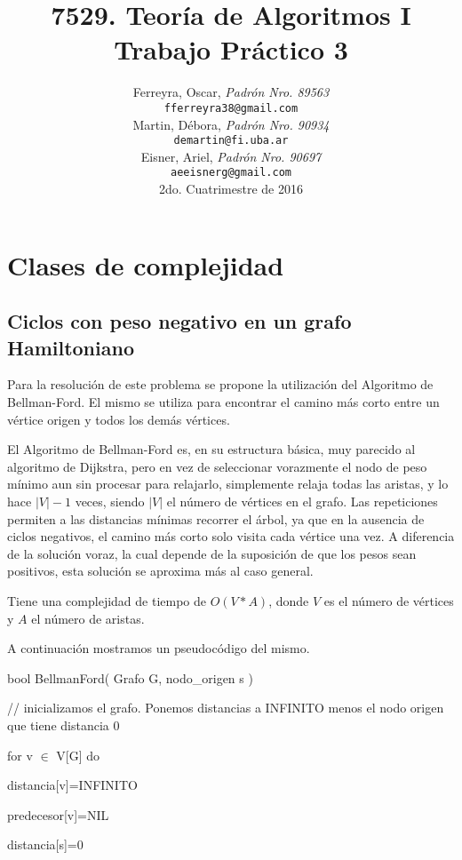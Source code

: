 \documentclass[a4paper,10pt]{article}
\title{
\textbf{ 
	7529. Teoría de Algoritmos I\\
	Trabajo Práctico 3
	}
}
\author{ Ferreyra, Oscar, \textit{Padrón Nro. 89563} \\
\texttt{ fferreyra38@gmail.com } \\[2.5ex]
Martin, Débora, \textit{Padrón Nro. 90934} \\
\texttt{ demartin@fi.uba.ar } \\[2.5ex]
Eisner, Ariel, \textit{Padrón Nro. 90697} \\
\texttt{ aeeisnerg@gmail.com } \\[2.5ex]
\normalsize{2do. Cuatrimestre de 2016} \\
}
\date{}
\begin{document}
\maketitle

\thispagestyle{empty} %
\setcounter{page}{0}
\newpage
\tableofcontents

\newpage

\section{Clases de complejidad}


\subsection{Ciclos con peso negativo en un grafo Hamiltoniano}
Para la resolución de este problema se propone la utilización del Algoritmo de Bellman-Ford. El mismo se utiliza para encontrar el camino más corto entre un vértice origen y todos los demás vértices.

El Algoritmo de Bellman-Ford es, en su estructura básica, muy parecido al algoritmo de Dijkstra, pero en vez de seleccionar vorazmente el nodo de peso mínimo aun sin procesar para relajarlo, simplemente relaja todas las aristas, y lo hace \(|V|-1\) veces, siendo \(|V|\) el número de vértices en el grafo. Las repeticiones permiten a las distancias mínimas recorrer el árbol, ya que en la ausencia de ciclos negativos, el camino más corto solo visita cada vértice una vez. A diferencia de la solución voraz, la cual depende de la suposición de que los pesos sean positivos, esta solución se aproxima más al caso general.

Tiene una complejidad de tiempo de \(O(V*A)\), donde \(V\) es el número de vértices y \(A\) el número de aristas.

A continuación mostramos un pseudocódigo del mismo.

\bigskip

bool BellmanFord( Grafo G, nodo\_origen s )

\quad      // inicializamos el grafo. Ponemos distancias a INFINITO menos el nodo origen que tiene distancia 0

\quad       for v \(\in\) V[G] do
           
\quad \quad           distancia[v]=INFINITO
           
\quad\quad           predecesor[v]=NIL
       
\quad       distancia[s]=0
      
\end{document}

